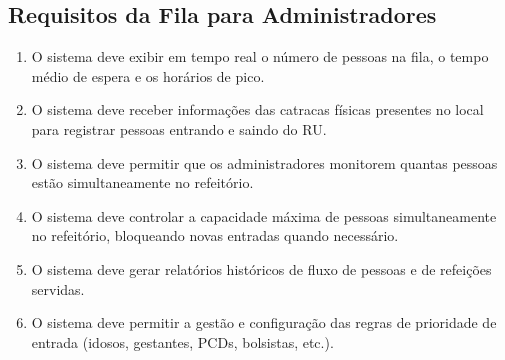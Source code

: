 \documentclass[12pt,a4paper]{article}
\begin{document}
\subsection{Requisitos da Fila para Administradores}
\begin{enumerate}[label=\textbf{RF-FIL-A-\arabic*}, leftmargin=*, align=left]
    \item O sistema deve exibir em tempo real o número de pessoas na fila, o tempo médio de espera e os horários de pico.
    \item O sistema deve receber informações das catracas físicas presentes no local para registrar pessoas entrando e saindo do RU.
    \item O sistema deve permitir que os administradores monitorem quantas pessoas estão simultaneamente no refeitório.
    \item O sistema deve controlar a capacidade máxima de pessoas simultaneamente no refeitório, bloqueando novas entradas quando necessário.
    \item O sistema deve gerar relatórios históricos de fluxo de pessoas e de refeições servidas.
  
    \item O sistema deve permitir a gestão e configuração das regras de prioridade de entrada (idosos, gestantes, PCDs, bolsistas, etc.).
\end{enumerate}
\end{document}
